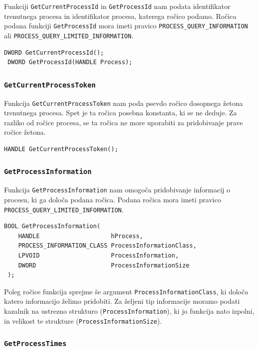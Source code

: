 \documentclass[a4paper,12pt,openright]{book}
\begin{document}
Funkciji \texttt{GetCurrentProcessId} in \texttt{GetProcessId} nam podata identifikator trenutnega procesa in identifikator procesa, katerega ročico podamo.
Ročica podana funkciji \texttt{GetProcessId} mora imeti pravico \texttt{PROCESS\_QUERY\_INFORMATION} ali \texttt{PROCESS\_QUERY\_LIMITED\_INFORMATION}.

\begin{lstlisting}[style=func]
 DWORD GetCurrentProcessId();
 DWORD GetProcessId(HANDLE Process);
\end{lstlisting}

\subsubsection{\texttt{GetCurrentProcessToken}}

Funkcija \texttt{GetCurrentProcessToken} nam poda psevdo ročico dosopnega žetona trenutnega procesa.
Spet je ta ročica posebna konstanta, ki se ne deduje.
Za razliko od ročice procesa, se ta ročica ne more uporabiti za pridobivanje prave ročice žetona.

\begin{lstlisting}[style=func]
 HANDLE GetCurrentProcessToken();
\end{lstlisting}

\subsubsection{\texttt{GetProcessInformation}}

Funkcija \texttt{GetProcessInformation} nam omogoča pridobivanje informacij o procesu, ki ga določa podana ročica.
Podana ročica mora imeti pravico \texttt{PROCESS\_QUERY\_LIMITED\_INFORMATION}.

\begin{lstlisting}[style=func]
 BOOL GetProcessInformation(
	HANDLE                    hProcess,
	PROCESS_INFORMATION_CLASS ProcessInformationClass,
	LPVOID                    ProcessInformation,
	DWORD                     ProcessInformationSize
 );
\end{lstlisting}

Poleg ročice funkcija sprejme še argument \texttt{ProcessInformationClass}, ki določa katero informacijo želimo pridobiti.
Za željeni tip informacije moramo podati kazalnik na ustrezno strukturo (\texttt{ProcessInformation}), ki jo funkcija nato izpolni, in velikost te strukture (\texttt{ProcessInformationSize}).

\subsubsection{\texttt{GetProcessTimes}}
\end{document}
